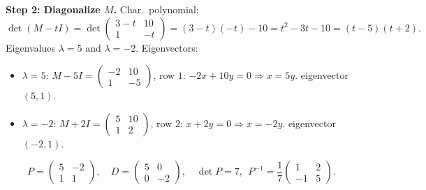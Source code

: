 \documentclass[a4paper,12pt]{article}
\newcommand{\EV}{eigenvector}
\begin{document}
\textbf{Step 2: Diagonalize $M$.} Char.\ polynomial:
\[
\det(M - tI) = \det\begin{pmatrix} 3-t & 10 \\ 1 & -t \end{pmatrix} = (3-t)(-t) - 10 = t^2 - 3t - 10 = (t-5)(t+2).
\]
Eigenvalues $\lambda = 5$ and $\lambda = -2$. Eigenvectors:
\begin{itemize}[leftmargin=*, nosep]
    \item $\lambda = 5$: $M - 5I = \left(\begin{smallmatrix} -2 & 10 \\ 1 & -5 \end{smallmatrix}\right)$, row $1$: $-2x + 10y = 0 \Rightarrow x = 5y$. \EV{} $(5, 1)$.
    \item $\lambda = -2$: $M + 2I = \left(\begin{smallmatrix} 5 & 10 \\ 1 & 2 \end{smallmatrix}\right)$, row $2$: $x + 2y = 0 \Rightarrow x = -2y$. \EV{} $(-2, 1)$.
\end{itemize}
\[
P = \begin{pmatrix} 5 & -2 \\ 1 & 1 \end{pmatrix},\quad D = \begin{pmatrix} 5 & 0 \\ 0 & -2 \end{pmatrix},\quad
\det P = 7,\ \ P^{-1} = \frac{1}{7}\begin{pmatrix} 1 & 2 \\ -1 & 5 \end{pmatrix}.
\]
\end{document}
